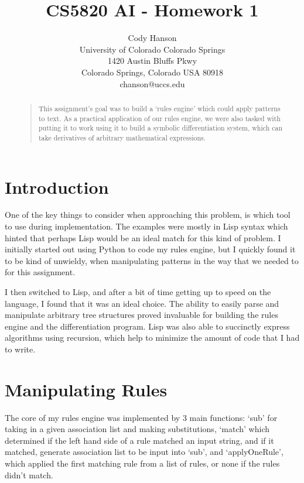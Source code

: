 \documentclass[letterpaper]{article}
\begin{document}
\title{CS5820 AI - Homework 1}
\author{Cody Hanson\\
University of Colorado Colorado Springs\\
1420 Austin Bluffs Pkwy\\
Colorado Springs, Colorado USA 80918\\
chanson@uccs.edu}
\maketitle
\begin{abstract}
\begin{quote}
This assignment's goal was to build a `rules engine' which could apply patterns to text.
As a practical application of our rules engine, we were also tasked with putting it to work using it
to build a symbolic differentiation system, which can take derivatives of arbitrary mathematical expressions.
\end{quote}
\end{abstract}

\section{Introduction}
One of the key things to consider when approaching this problem, is which
tool to use during implementation. The examples were mostly in Lisp syntax
which hinted that perhaps Lisp would be an ideal match for this kind
of problem. I initially started out using Python to code my rules engine,
but I quickly found it to be kind of unwieldy, when manipulating patterns in
the way that we needed to for this assignment.

I then switched to Lisp, and after a bit of time getting up to speed on the
language, I found that it was an ideal choice. The ability to easily parse 
and manipulate arbitrary tree structures proved invaluable for building the
rules engine and the differentiation program. Lisp was also able to
succinctly express algorithms using recursion, which help to minimize
the amount of code that I had to write.

\section{Manipulating Rules}
The core of my rules engine was implemented by 3 main functions: `sub' for
taking in a given association list and making substitutions, `match' which determined
if the left hand side of a rule matched an input string, and if it matched, generate
association list to be input into `sub', and `applyOneRule', which applied the first
matching rule from a list of rules, or none if the rules didn't match.
\end{document}
